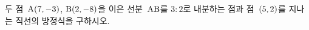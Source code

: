 두 점~$\mathrm{A}(7{,}\mkern3mu\mathopen{}-3)$, $\mathrm{B}(2{,}\mkern3mu\mathopen{}-8)$을 이은 선분~$\mathrm{AB}$를 $3:2$로 내분하는 점과 점~$(5{,}\mkern3mu\mathopen{}2)$를 지나는 직선의 방정식을 구하시오.
